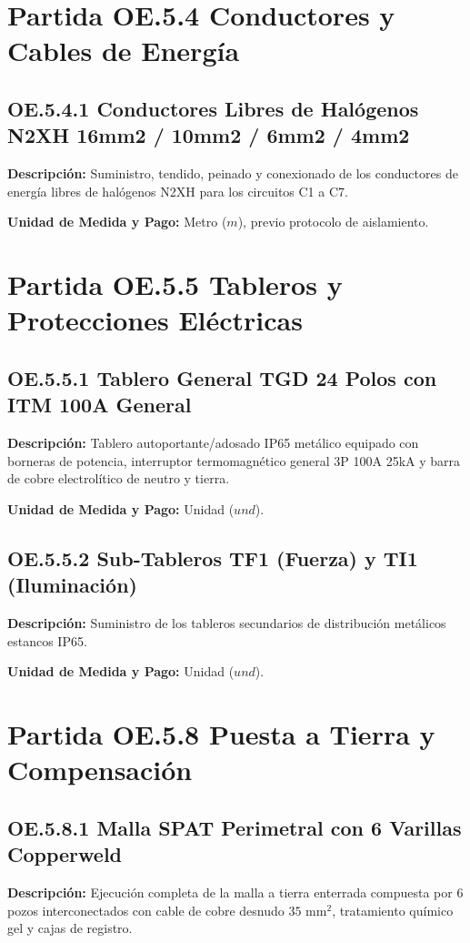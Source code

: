 \section{Partida OE.5.4 Conductores y Cables de Energía}

\subsection{OE.5.4.1 Conductores Libres de Halógenos N2XH 16mm2 / 10mm2 / 6mm2 / 4mm2}
\textbf{Descripción:} Suministro, tendido, peinado y conexionado de los conductores de energía libres de halógenos N2XH para los circuitos C1 a C7.

\textbf{Unidad de Medida y Pago:} Metro ($m$), previo protocolo de aislamiento.

\section{Partida OE.5.5 Tableros y Protecciones Eléctricas}

\subsection{OE.5.5.1 Tablero General TGD 24 Polos con ITM 100A General}
\textbf{Descripción:} Tablero autoportante/adosado IP65 metálico equipado con borneras de potencia, interruptor termomagnético general 3P 100A 25kA y barra de cobre electrolítico de neutro y tierra.

\textbf{Unidad de Medida y Pago:} Unidad ($und$).

\subsection{OE.5.5.2 Sub-Tableros TF1 (Fuerza) y TI1 (Iluminación)}
\textbf{Descripción:} Suministro de los tableros secundarios de distribución metálicos estancos IP65.

\textbf{Unidad de Medida y Pago:} Unidad ($und$).

\section{Partida OE.5.8 Puesta a Tierra y Compensación}

\subsection{OE.5.8.1 Malla SPAT Perimetral con 6 Varillas Copperweld}
\textbf{Descripción:} Ejecución completa de la malla a tierra enterrada compuesta por 6 pozos interconectados con cable de cobre desnudo $35\text{ mm}^2$, tratamiento químico gel y cajas de registro.

